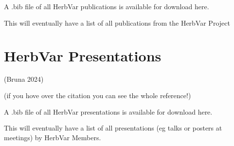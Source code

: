 \documentclass[
  letterpaper,
  DIV=11,
  numbers=noendperiod]{scrreprt}
\begin{document}
A .bib file of all HerbVar publications is available for download here.

This will eventually have a list of all publications from the HerbVar
Project

\chapter*{HerbVar Presentations}\label{herbvar-presentations}


(Bruna 2024)

(if you hove over the citation you can see the whole reference!)

A .bib file of all HerbVar presentations is available for download here.

This will eventually have a list of all presentations (eg talks or
posters at meetings) by HerbVar Members.
\end{document}
